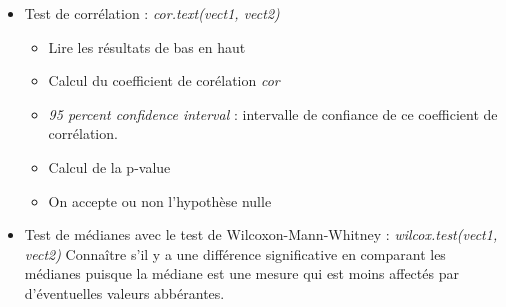 \documentclass[12pt,a4paper]{article}
\begin{document}
\begin{itemize}
\item Test de corrélation : \textit{cor.text(vect1, vect2)}
\begin{itemize}
\item Lire les résultats de bas en haut
\item Calcul du coefficient de corélation \textit{cor}
\item \textit{95 percent confidence interval} : intervalle de confiance de ce coefficient de corrélation.
\item Calcul de la p-value
\item On accepte ou non l'hypothèse nulle
\end{itemize}
\item Test de médianes avec le test de Wilcoxon-Mann-Whitney : \textit{wilcox.test(vect1, vect2)}
\newline Connaître s'il y a une différence significative en comparant les médianes puisque la médiane est une mesure qui est moins affectés par d'éventuelles valeurs abbérantes.
\end{itemize}
\end{document}
